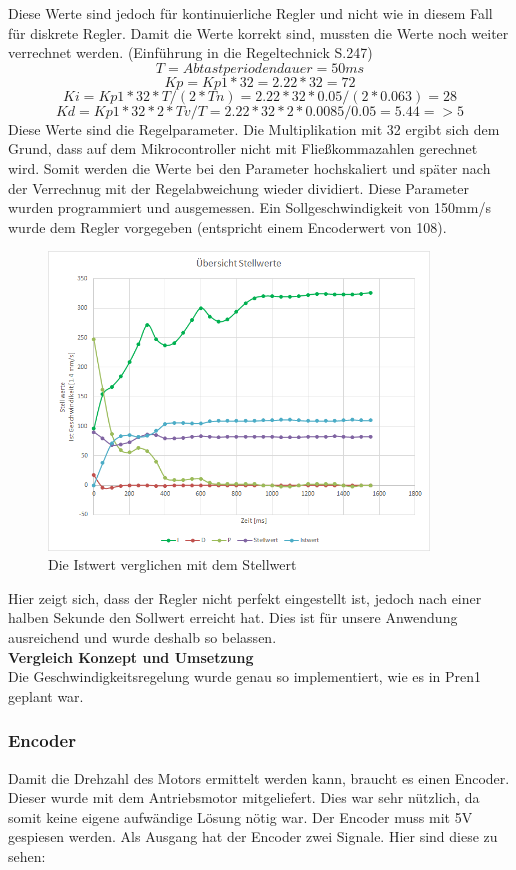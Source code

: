 Diese Werte sind jedoch für kontinuierliche Regler und nicht wie in diesem Fall für diskrete Regler. Damit die Werte korrekt sind, mussten die Werte noch weiter verrechnet werden. (Einführung in die Regeltechnick S.247)
\[ T=Abtastperiodendauer=50ms\]
\[ Kp=Kp1*32=2.22*32=72\]
\[ Ki=Kp1*32*T/(2*Tn)=2.22*32*0.05/(2*0.063)=28\]
\[ Kd=Kp1*32*2*Tv/T=2.22*32*2*0.0085/0.05=5.44 =>5\]
Diese Werte sind die Regelparameter. Die Multiplikation mit 32 ergibt sich dem Grund, dass auf dem Mikrocontroller nicht mit Fließkommazahlen gerechnet wird. Somit werden die Werte bei den Parameter hochskaliert und später nach der Verrechnug mit der Regelabweichung wieder dividiert.
Diese Parameter wurden programmiert und ausgemessen. Ein Sollgeschwindigkeit von 150mm/s wurde dem Regler vorgegeben (entspricht einem Encoderwert von 108).
\begin{figure}[H]%
\centering
\includegraphics[width=0.9\textwidth]{03_Loesungskonzept/pictures/StellwertePID.png}
\caption{Die Istwert verglichen mit dem Stellwert}
\label{fig:IstSollwertVergleich}
\end{figure}
Hier zeigt sich, dass der Regler nicht perfekt eingestellt ist, jedoch nach einer halben Sekunde den Sollwert erreicht hat. Dies ist für unsere Anwendung ausreichend und wurde deshalb so belassen.\\[0.2cm]
\textbf{Vergleich Konzept und Umsetzung}\\[0.2cm]
Die Geschwindigkeitsregelung wurde genau so implementiert, wie es in Pren1 geplant war.
\subsubsection{Encoder}
Damit die Drehzahl des Motors ermittelt werden kann, braucht es einen Encoder. Dieser wurde mit dem Antriebsmotor mitgeliefert. Dies war sehr nützlich, da somit keine eigene aufwändige Lösung nötig war. Der Encoder muss mit 5V gespiesen werden. Als Ausgang hat der Encoder zwei Signale. Hier sind diese zu sehen:

